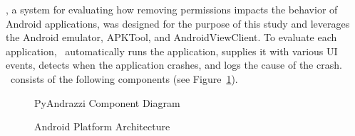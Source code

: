 

\toolname, a system for evaluating how removing permissions impacts the behavior of Android applications, was designed for the purpose of this study and leverages the Android emulator, APKTool, and AndroidViewClient.  To evaluate each application, \toolname\ automatically runs the application, supplies it with various UI events, detects when the application crashes, and logs the cause of the crash.  \toolname\ consists of the following components (see Figure~\ref{fig:diagram}).

\begin{figure}[b]
\figsp
\centerline{}
\caption{PyAndrazzi Component Diagram}
\label{fig:diagram}
\end{figure}

\begin{figure}[b]
\centerline{}
\caption{Android Platform Architecture}
\label{fig:architecture}
\end{figure}

